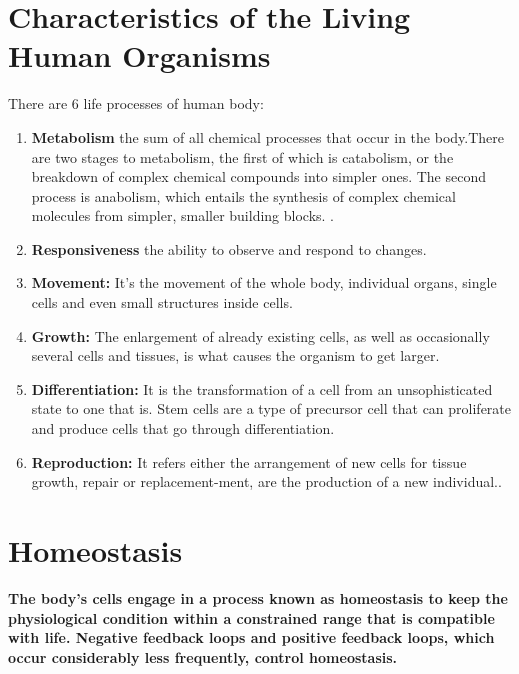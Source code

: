 \documentclass[12pt]{article}
\begin{document}
\section{Characteristics of the Living Human Organisms}
There are 6 life processes of human body:
\begin{enumerate}
    \item \textbf{Metabolism} the sum of all chemical processes that occur in the body.There are two stages to metabolism, the first of which is catabolism, or the breakdown of complex chemical compounds into simpler ones. The second process is anabolism, which entails the synthesis of complex chemical molecules from simpler, smaller building blocks.
.
    \item \textbf{Responsiveness}  the ability to observe and respond to changes.
   
    \item \textbf{Movement:}  It’s the movement of the whole body, individual organs, single cells and even small structures inside cells.
   
    \item \textbf{Growth:} The enlargement of already existing cells, as well as occasionally several cells and tissues, is what causes the organism to get larger.
   
    \item \textbf{Differentiation:} It is the transformation of a cell from an unsophisticated state to one that is. Stem cells are a type of precursor cell that can proliferate and produce cells that go through differentiation.
   
    \item \textbf{Reproduction:} It refers either the arrangement of new cells for tissue growth, repair or replacement-ment, are the production of a new individual..
   
\end{enumerate}
\section{Homeostasis}
\textbf{The body's cells engage in a process known as homeostasis to keep the physiological condition within a constrained range that is compatible with life. Negative feedback loops and positive feedback loops, which occur considerably less frequently, control homeostasis.}
\end{document}
